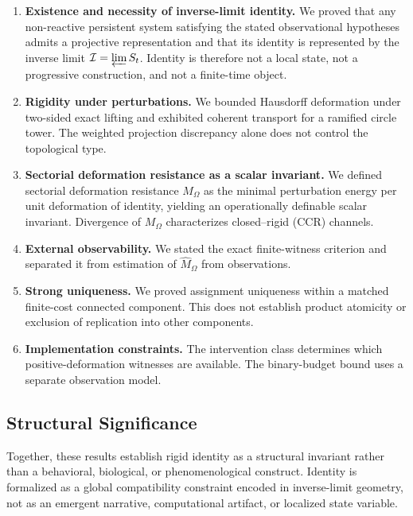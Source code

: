 \documentclass[11pt,a4paper]{article}
\theoremstyle{plain}
\theoremstyle{definition}
\theoremstyle{remark}
\begin{document}
\begin{enumerate}[leftmargin=*]
    \item \textbf{Existence and necessity of inverse-limit identity.} We proved that any non-reactive persistent system satisfying the stated observational hypotheses admits a projective representation and that its identity is represented by the inverse limit $\mathcal{I} = \varprojlim S_t$. Identity is therefore not a local state, not a progressive construction, and not a finite-time object.
    
    \item \textbf{Rigidity under perturbations.} We bounded Hausdorff deformation under two-sided exact lifting and exhibited coherent transport for a ramified circle tower. The weighted projection discrepancy alone does not control the topological type.
    
    \item \textbf{Sectorial deformation resistance as a scalar invariant.} We defined sectorial deformation resistance $M_\Omega$ as the minimal perturbation energy per unit deformation of identity, yielding an operationally definable scalar invariant. Divergence of $M_\Omega$ characterizes closed--rigid (CCR) channels.
    
    \item \textbf{External observability.} We stated the exact finite-witness criterion and separated it from estimation of $\hat{M}_\Omega$ from observations.
    
    \item \textbf{Strong uniqueness.} We proved assignment uniqueness within a matched finite-cost connected component. This does not establish product atomicity or exclusion of replication into other components.
    
    \item \textbf{Implementation constraints.} The intervention class determines which positive-deformation witnesses are available. The binary-budget bound uses a separate observation model.
\end{enumerate}

\subsection{Structural Significance}

Together, these results establish rigid identity as a structural invariant rather than a behavioral, biological, or phenomenological construct. Identity is formalized as a global compatibility constraint encoded in inverse-limit geometry, not as an emergent narrative, computational artifact, or localized state variable.
\end{document}
